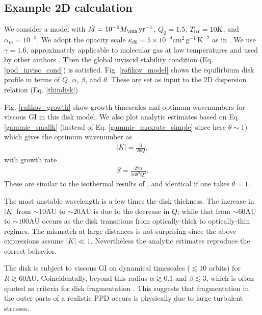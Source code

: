 \subsection{Example 2D calculation}\label{pp2d_example}
We consider a model with $\dot{M} = 10^{-6}M_\sun\,\yr^{-1}$, $Q_0=1.5$, 
$T_\mathrm{irr}=10\mathrm{K}$, and $\alpha_m=10^{-3}$. 
We adopt the opacity scale $\kappa_{d0} =
5\times10^{-4}\mathrm{cm}^2\,\mathrm{g}^{-1}\,\mathrm{K}^{-2}$  as in
. We use $\gamma=1.6$, approximately applicable
to molecular gas at low temperatures and used by other authors
\citep{rice11,baehr15}. Then the global inviscid stability condition
(Eq. \ref{ppd_invisc_cond}) is satisfied. 
Fig. \ref{rafikov_model} shows the equilirbium 
disk profile in terms of $Q$, $\alpha$, $\beta$, and $\theta$.  
These are set as input to the 2D dispersion relation
(Eq. \ref{thindisk}).    

Fig. \ref{rafikov_growth} show growth timescales and
optimum wavenumbers for viscous GI in this disk model.  
We also plot analytic estimates based on Eq. \ref{gammie_smallk} (instead of
Eq. \ref{gammie_maxrate_simple} since here $\theta\sim 1$) 
which gives the optimum wavenumber as
\begin{align}
  |K| = \frac{3}{2\theta Q},
\end{align}
with growth rate
\begin{align} 
  S = \frac{27\alpha}{16\theta^3Q^4}. 
\end{align}
These are similar to the isothermal results of
\citet[][their Eq. 19 and 21, respectively]{sterzik95}, and identical if one
takes $\theta=1$. %
 
The most unstable wavelength is a few times the disk thickness. The
increase in $|K|$ from $\sim 10\mathrm{AU}$ to $\sim 20\mathrm{AU}$ is
due to the decrease in $Q$; while that from $\sim 60\mathrm{AU}$ to
$\sim 100\mathrm{AU}$ occurs as the disk transitions from
optically-thick to optically-thin regimes. The mismatch at large
distances is  
not surprising since the above expressions assume $|K|\ll
1$. Nevertheless the analytic estimates reproduce the correct
behavior.  

The disk is subject to viscous GI on dynamical timescales ($\lesssim
10$ orbits) for $R\gtrsim60$AU. Coincidentally, beyond this radius
$\alpha\gtrsim 0.1$ and $\beta\lesssim 3$, which is often quoted as 
criteria for disk fragmentation \citep[e.g.][]{rafikov15}. 
This suggests that fragmentation in the outer parts of a realistic PPD
occurs is physically due to large turbulent stresses. 

